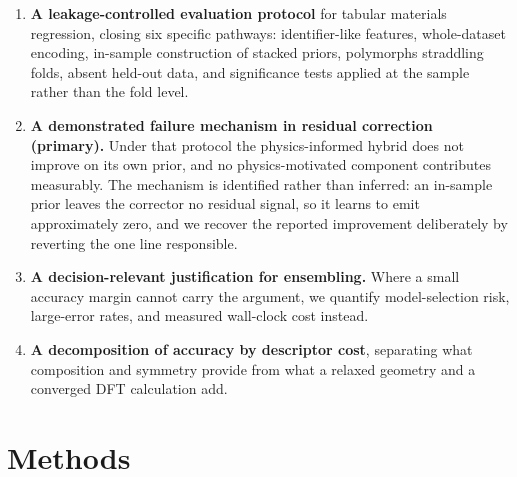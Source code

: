 \documentclass{ieeeaccess}
\begin{document}
\begin{enumerate}
\item \textbf{A leakage-controlled evaluation protocol} for tabular materials regression, closing six specific pathways: identifier-like features, whole-dataset encoding, in-sample construction of stacked priors, polymorphs straddling folds, absent held-out data, and significance tests applied at the sample rather than the fold level.

\item \textbf{A demonstrated failure mechanism in residual correction (primary).} Under that protocol the physics-informed hybrid does not improve on its own prior, and no physics-motivated component contributes measurably. The mechanism is identified rather than inferred: an in-sample prior leaves the corrector no residual signal, so it learns to emit approximately zero, and we recover the reported improvement deliberately by reverting the one line responsible.

\item \textbf{A decision-relevant justification for ensembling.} Where a small accuracy margin cannot carry the argument, we quantify model-selection risk, large-error rates, and measured wall-clock cost instead.

\item \textbf{A decomposition of accuracy by descriptor cost}, separating what composition and symmetry provide from what a relaxed geometry and a converged DFT calculation add.
\end{enumerate}

\section{Methods}
\label{sec:methods}
\end{document}
